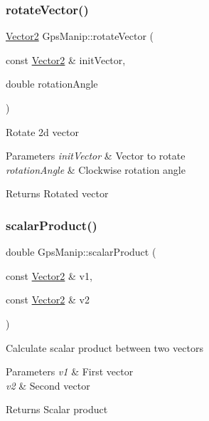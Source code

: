\subsubsection{\texorpdfstring{rotate\+Vector()}{rotateVector()}}
{\footnotesize\ttfamily \mbox{\hyperlink{struct_vector2}{Vector2}} Gps\+Manip\+::rotate\+Vector (\begin{DoxyParamCaption}\item[{const \mbox{\hyperlink{struct_vector2}{Vector2}} \&}]{init\+Vector,  }\item[{double}]{rotation\+Angle }\end{DoxyParamCaption})\hspace{0.3cm}{\ttfamily [static]}}

Rotate 2d vector 
\begin{DoxyParams}{Parameters}
{\em init\+Vector} & Vector to rotate \\
\hline
{\em rotation\+Angle} & Clockwise rotation angle \\
\hline
\end{DoxyParams}
\begin{DoxyReturn}{Returns}
Rotated vector 
\end{DoxyReturn}
\mbox{\label{class_m210_1_1_gps_manip_a65fa5b63dfcdf3ad4e77e2d7c2f94f58}} 
\subsubsection{\texorpdfstring{scalar\+Product()}{scalarProduct()}}
{\footnotesize\ttfamily double Gps\+Manip\+::scalar\+Product (\begin{DoxyParamCaption}\item[{const \mbox{\hyperlink{struct_vector2}{Vector2}} \&}]{v1,  }\item[{const \mbox{\hyperlink{struct_vector2}{Vector2}} \&}]{v2 }\end{DoxyParamCaption})\hspace{0.3cm}{\ttfamily [static]}}

Calculate scalar product between two vectors 
\begin{DoxyParams}{Parameters}
{\em v1} & First vector \\
\hline
{\em v2} & Second vector \\
\hline
\end{DoxyParams}
\begin{DoxyReturn}{Returns}
Scalar product 
\end{DoxyReturn}
\mbox{\label{class_m210_1_1_gps_manip_aaeb89d7f581d6171aa8bc33b76c9d532}} 
